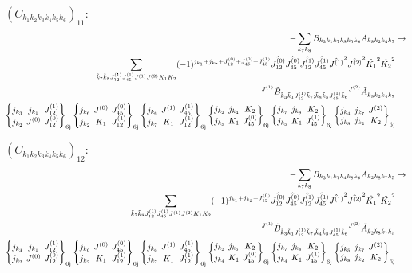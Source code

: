 \documentclass[11pt]{article}
\newcommand{\sixj}[6]{\begingroup\setlength{\arraycolsep}{0.2em}\begin{Bmatrix} #1 & #2 & #3 \\ #4 & #5 & #6 \end{Bmatrix}_{\text{6j}}\endgroup}
\begin{document}
$\left({C}_{{k}_{1}{k}_{2}{k}_{3}{k}_{4}{k}_{5}{k}_{6}}\right)_{11}$:
\begin{align}
-\sum_{{k}_{7}{k}_{8}}{B}_{{k}_{3}{k}_{1}{k}_{7}{k}_{8}{k}_{5}{k}_{6}}{A}_{{k}_{8}{k}_{2}{k}_{4}{k}_{7}}&\rightarrow \notag \\\sum_{\tilde{k}_{7}\tilde{k}_{8}J^{(1)}_{12}J^{(1)}_{45}J^{(1)}J^{(2)}K_{1}K_{2}}(-1)^{j_{{k}_{1}} +j_{{k}_{7}} +J^{(0)}_{12} +J^{(0)}_{45} +J^{(1)}_{45} }\hat{J^{(0)}_{12}}\hat{J^{(0)}_{45}}\hat{J^{(1)}_{12}}\hat{J^{(1)}_{45}}\hat{J^{(1)}}^{2}\hat{J^{(2)}}^{2}\hat{K_{1}}^{2}\hat{K_{2}}^{2}& \notag \\{}^{J^{(1)}}\tilde{B}_{\tilde{k}_{3}\tilde{k}_{1}J^{(1)}_{12}\tilde{k}_{7};\tilde{k}_{8}\tilde{k}_{5}J^{(1)}_{45}\tilde{k}_{6}}{}^{J^{(2)}}\tilde{A}_{\tilde{k}_{8}\tilde{k}_{2}\tilde{k}_{4}\tilde{k}_{7}}& \notag \\\sixj{j_{{k}_{3}}}{j_{{k}_{1}}}{J^{(1)}_{12}}{j_{{k}_{2}}}{J^{(0)}}{J^{(0)}_{12}}\sixj{j_{{k}_{6}}}{J^{(0)}}{J^{(0)}_{45}}{j_{{k}_{2}}}{K_{1}}{J^{(1)}_{12}}\sixj{j_{{k}_{6}}}{J^{(1)}}{J^{(1)}_{45}}{j_{{k}_{7}}}{K_{1}}{J^{(1)}_{12}}\sixj{j_{{k}_{2}}}{j_{{k}_{4}}}{K_{2}}{j_{{k}_{5}}}{K_{1}}{J^{(0)}_{45}}\sixj{j_{{k}_{7}}}{j_{{k}_{8}}}{K_{2}}{j_{{k}_{5}}}{K_{1}}{J^{(1)}_{45}}\sixj{j_{{k}_{4}}}{j_{{k}_{7}}}{J^{(2)}}{j_{{k}_{8}}}{j_{{k}_{2}}}{K_{2}}
\end{align}

$\left({C}_{{k}_{1}{k}_{2}{k}_{3}{k}_{4}{k}_{5}{k}_{6}}\right)_{12}$:
\begin{align}
-\sum_{{k}_{7}{k}_{8}}{B}_{{k}_{3}{k}_{1}{k}_{7}{k}_{4}{k}_{8}{k}_{6}}{A}_{{k}_{2}{k}_{8}{k}_{7}{k}_{5}}&\rightarrow \notag \\\sum_{\tilde{k}_{7}\tilde{k}_{8}J^{(1)}_{12}J^{(1)}_{45}J^{(1)}J^{(2)}K_{1}K_{2}}(-1)^{j_{{k}_{1}} +j_{{k}_{2}} +J^{(0)}_{12} }\hat{J^{(0)}_{12}}\hat{J^{(0)}_{45}}\hat{J^{(1)}_{12}}\hat{J^{(1)}_{45}}\hat{J^{(1)}}^{2}\hat{J^{(2)}}^{2}\hat{K_{1}}^{2}\hat{K_{2}}^{2}& \notag \\{}^{J^{(1)}}\tilde{B}_{\tilde{k}_{3}\tilde{k}_{1}J^{(1)}_{12}\tilde{k}_{7};\tilde{k}_{4}\tilde{k}_{8}J^{(1)}_{45}\tilde{k}_{6}}{}^{J^{(2)}}\tilde{A}_{\tilde{k}_{2}\tilde{k}_{8}\tilde{k}_{7}\tilde{k}_{5}}& \notag \\\sixj{j_{{k}_{3}}}{j_{{k}_{1}}}{J^{(1)}_{12}}{j_{{k}_{2}}}{J^{(0)}}{J^{(0)}_{12}}\sixj{j_{{k}_{6}}}{J^{(0)}}{J^{(0)}_{45}}{j_{{k}_{2}}}{K_{1}}{J^{(1)}_{12}}\sixj{j_{{k}_{6}}}{J^{(1)}}{J^{(1)}_{45}}{j_{{k}_{7}}}{K_{1}}{J^{(1)}_{12}}\sixj{j_{{k}_{2}}}{j_{{k}_{5}}}{K_{2}}{j_{{k}_{4}}}{K_{1}}{J^{(0)}_{45}}\sixj{j_{{k}_{7}}}{j_{{k}_{8}}}{K_{2}}{j_{{k}_{4}}}{K_{1}}{J^{(1)}_{45}}\sixj{j_{{k}_{5}}}{j_{{k}_{7}}}{J^{(2)}}{j_{{k}_{8}}}{j_{{k}_{2}}}{K_{2}}
\end{align}
\end{document}
